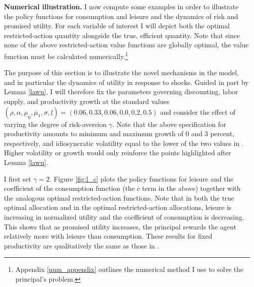 \documentclass[11pt]{article}
\theoremstyle{plain}
\newcommand{\alphval}{0.33}
\newcommand{\sig}{0.2}
\newcommand{\lbar}{0.5}
\newcommand{\mulow}{0.0}
\newcommand{\muhigh}{0.06}
\newcommand{\rhoval}{0.06}
\begin{document}
\textbf{Numerical illustration.} I now compute some examples in order to illustrate the policy functions for consumption and leisure and the dynamics of risk and promised utility. For each variable of interest I will depict both the optimal restricted-action quantity alongside the true, efficient quantity. Note that since none of the above restricted-action value functions are globally optimal, the value function must be calculated numerically.\footnote{Appendix \ref{num_appendix} outlines the numerical method I use to solve the principal's problem.} 


The purpose of this section is to illustrate the novel mechanisms in the model, and in particular the dynamics of utility in response to shocks. Guided in part by Lemma \ref{lawu}, I will therefore fix the parameters governing discounting, labor supply, and productivity growth at the standard values $(\rho, \alpha, \underline{\mu}_0, \overline{\mu}_1, \sigma, \underline{l}) = (\rhoval, \alphval, \muhigh, \mulow, \sig, \lbar)$ and consider the effect of varying the degree of risk-aversion $\gamma$. Note that the above specification for productivity amounts to minimum and maximum growth of 0 and 3 percent, respectively, and idiosyncratic volatility equal to the lower of the two values in \cite{angeletos_uninsured_2007}. Higher volatility or growth would only reinforce the points highlighted after Lemma \ref{lawu}. 


I first set $\gamma = 2$. Figure \ref{fig:l_c} plots the policy functions for leisure and the coefficient of the consumption function (the $\overline{c}$ term in the above) together with the analogous optimal restricted-action functions. Note that in both the true optimal allocation and in the optimal restricted-action allocations, leisure is increasing in normalized utility and the coefficient of consumption is decreasing. This shows that as promised utility increases, the principal rewards the agent relatively more with leisure than consumption. These results for fixed productivity are qualitatively the same as those in \cite{sannikov_continuous-time_2008}.
\end{document}
